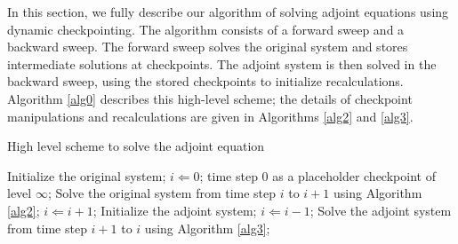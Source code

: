 In this section, we fully describe our algorithm of solving adjoint equations
using dynamic checkpointing.  The algorithm consists of a forward sweep and
a backward sweep.  The forward sweep solves the original system and stores
intermediate solutions at checkpoints.  The adjoint system is then solved in
the backward sweep, using the stored checkpoints to initialize recalculations.
Algorithm \ref{alg0} describes this high-level scheme; the details of
checkpoint manipulations and recalculations are given in Algorithms \ref{alg2}
and \ref{alg3}.
\begin{algorithm}
\caption{High level scheme to solve the adjoint equation}
\label{alg0}
\begin{algorithmic}[indent=3em]
    \STATE Initialize the original system;
    \STATE $i \Leftarrow 0$;
     time step 0 as a placeholder checkpoint of level $\infty$;
        \STATE Solve the original system from time step $i$ to $i + 1$ using
               Algorithm \ref{alg2};
        \STATE $i \Leftarrow i + 1$;
    \ENDWHILE
    \STATE Initialize the adjoint system;
        \STATE $i \Leftarrow i - 1$;
        \STATE Solve the adjoint system from time step $i + 1$ to $i$ using
               Algorithm \ref{alg3};
    \ENDWHILE
\end{algorithmic}
\end{algorithm}

